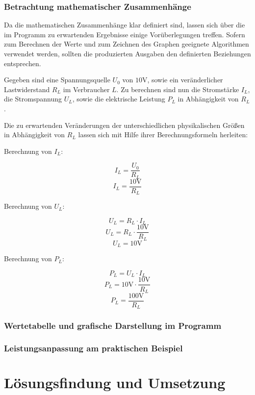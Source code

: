 \documentclass{article}
\begin{document}
    \subsubsection{Betrachtung mathematischer Zusammenhänge}

    Da die mathematischen Zusammenhänge klar definiert sind, lassen sich über die im Programm zu erwartenden Ergebnisse einige Vorüberlegungen treffen.
    Sofern zum Berechnen der Werte und zum Zeichnen des Graphen geeignete Algorithmen verwendet werden, sollten die produzierten Ausgaben den definierten Beziehungen entsprechen.

    Gegeben sind eine Spannungsquelle $U_0$ von $10 \si{\volt}$, sowie ein veränderlicher Lastwiderstand $R_L$ im Verbraucher $L$.
    Zu berechnen sind nun die Stromstärke $I_L$, die Stromspannung $U_L$, sowie die elektrische Leistung $P_L$ in Abhängigkeit von $R_L$.

    Die zu erwartenden Veränderungen der unterschiedlichen physikalischen Größen in Abhängigkeit von $R_L$ lassen sich mit Hilfe ihrer Berechnungsformeln herleiten:

    Berechnung von $I_L$:

    \[ I_L = \frac{U_0}{R_L} \]
    \[ I_L = \frac{10\si{\volt}}{R_L} \]

    Berechnung von $U_L$:

    \[ U_L = R_L \cdot I_L \]
    \[ U_L = R_L \cdot \frac{10\si{\volt}}{R_L} \]
    \[ U_L = 10\si{\volt} \]

    Berechnung von $P_L$:

    \[ P_L = U_L \cdot I_L \]
    \[ P_L = 10\si{\volt} \cdot \frac{10\si{\volt}}{R_L} \]
    \[ P_L = \frac{100\si{\volt}}{R_L} \]

    \subsubsection{Wertetabelle und grafische Darstellung im Programm}

    \subsubsection{Leistungsanpassung am praktischen Beispiel}

\newpage
\section{Lösungsfindung und Umsetzung}
\end{document}
